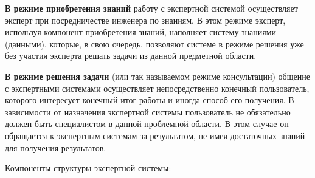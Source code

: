 \documentclass[a4paper,final]{article}
\begin{document}
\textbf{В режиме приобретения знаний} работу с экспертной системой осуществляет эксперт при посредничестве инженера по знаниям. В этом режиме эксперт, используя компонент приобретения знаний, наполняет систему знаниями (данными), которые, в свою очередь, позволяют системе в режиме решения уже без участия эксперта решать задачи из данной предметной области.

\textbf{В режиме решения задачи} (или так называемом режиме консультации) общение с экспертными системами осуществляет непосредственно конечный пользователь, которого интересует конечный итог работы и иногда способ его получения. В зависимости от назначения экспертной системы пользователь не обязательно должен быть специалистом в данной проблемной области. В этом случае он обращается к экспертным системам за результатом, не имея достаточных знаний для получения результатов.

Компоненты структуры экспертной системы:
\end{document}
